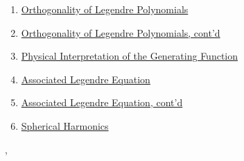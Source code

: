 \documentclass[11pt]{article}
\renewcommand{\today}{\shortmonthname[\the\month] \the \day,  \the\year}
\begin{document}
\begin{enumerate}
	\item \href{https://mp.weixin.qq.com/s/HDWGrbzTWtbSsO3xZgVeeg}{Orthogonality of Legendre Polynomials}	%
	\item \href{https://mp.weixin.qq.com/s/H7WozThNHJAqmupvJf8H-A}{Orthogonality of Legendre Polynomials, cont'd}	%
	\item \href{https://mp.weixin.qq.com/s/MLn-V3pYs6BsIvyyuxJmKQ}{Physical Interpretation of the Generating Function}	%
	\item \href{https://mp.weixin.qq.com/s/37o2x9AJsUX-z2VeGALH6A}{Associated Legendre Equation}	%
	\item \href{https://mp.weixin.qq.com/s/aU9Za7cqDEPJbBFrfZOFAg}{Associated Legendre Equation, cont'd}	%
	\item \href{https://mp.weixin.qq.com/s/aurUWxJnuPOFeSZ-_2Wz9A}{Spherical Harmonics}	%
\end{enumerate}




%
\begin{flushright}
	\tiny \today 
\end{flushright}
\end{document}
